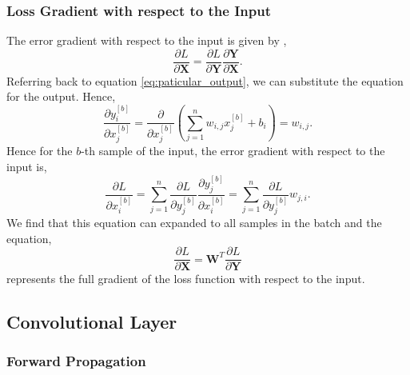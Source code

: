 \documentclass[twocolumn,pra,floatfix]{revtex4-2}
\begin{document}
            \subsubsection{Loss Gradient with respect to the Input}
            
                The error gradient with respect to the input is given by \cite{Bendersky2018},
                \begin{equation}
                    \frac{\partial L}{\partial \mathbf{X}} = \frac{\partial L}{\partial \mathbf{Y}} \frac{\partial \mathbf{Y}}{\partial \mathbf{X}}.
                \end{equation}
                Referring back to equation \ref{eq:paticular_output}, we can substitute the equation for the output. Hence,
                \begin{equation}
                    \frac{\partial y^{[b]}_i}{\partial x_j^{[b]}} = \frac{\partial}{\partial x_j^{[b]}} \left( \sum_{j=1}^{n} w_{i,j} x_j^{[b]} + b_i \right) = w_{i,j}.
                \end{equation}
                Hence for the $b$-th sample of the input, the error gradient with respect to the input is, 
                \begin{equation}
                    \frac{\partial L}{\partial x^{[b]}_i} = \sum_{j=1}^{n} \frac{\partial L}{\partial y^{[b]}_j} \frac{\partial y^{[b]}_j}{\partial x^{[b]}_i} =
                    \sum_{j=1}^{n} \frac{\partial L}{\partial y^{[b]}_j} w_{j,i}.
                \end{equation}
                We find that this equation can expanded to all samples in the batch and the equation,
                \begin{equation}
                    \frac{\partial L}{\partial \mathbf{X}} = \mathbf{W}^T \frac{\partial L}{\partial \mathbf{Y}}
                \end{equation}
                represents the full gradient of the loss function with respect to the input.
                
        \subsection{Convolutional Layer}
        
            \subsubsection{Forward Propagation}
            
\end{document}
